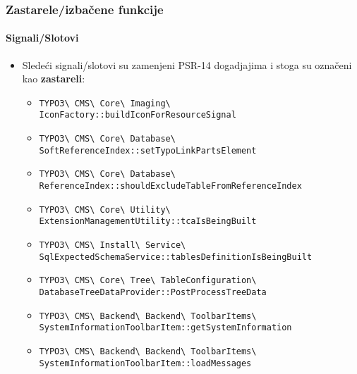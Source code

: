 \begin{frame}[fragile]
	\frametitle{Zastarele/izbačene funkcije}
	\framesubtitle{Signali/Slotovi}

	\lstset{basicstyle=\tiny\ttfamily}

	\begin{itemize}
		\item Sledeći signali/slotovi su zamenjeni PSR-14 dogadjajima i stoga su označeni kao \textbf{zastareli}:
			\newline

			\begin{itemize}\tiny
				\item \texttt{TYPO3\textbackslash
					CMS\textbackslash
					Core\textbackslash
					Imaging\textbackslash
					IconFactory::buildIconForResourceSignal}
					\newline
				\item \texttt{TYPO3\textbackslash
					CMS\textbackslash
					Core\textbackslash
					Database\textbackslash
					SoftReferenceIndex::setTypoLinkPartsElement}
					\newline
				\item \texttt{TYPO3\textbackslash
					CMS\textbackslash
					Core\textbackslash
					Database\textbackslash
					ReferenceIndex::shouldExcludeTableFromReferenceIndex}
					\newline
				\item \texttt{TYPO3\textbackslash
					CMS\textbackslash
					Core\textbackslash
					Utility\textbackslash
					ExtensionManagementUtility::tcaIsBeingBuilt}
					\newline
				\item \texttt{TYPO3\textbackslash
					CMS\textbackslash
					Install\textbackslash
					Service\textbackslash
					SqlExpectedSchemaService::tablesDefinitionIsBeingBuilt}
					\newline
				\item \texttt{TYPO3\textbackslash
					CMS\textbackslash
					Core\textbackslash
					Tree\textbackslash
					TableConfiguration\textbackslash
					DatabaseTreeDataProvider::PostProcessTreeData}
					\newline
				\item \texttt{TYPO3\textbackslash
					CMS\textbackslash
					Backend\textbackslash
					Backend\textbackslash
					ToolbarItems\textbackslash
					SystemInformationToolbarItem::getSystemInformation}
					\newline
				\item \texttt{TYPO3\textbackslash
					CMS\textbackslash
					Backend\textbackslash
					Backend\textbackslash
					ToolbarItems\textbackslash
					SystemInformationToolbarItem::loadMessages}

			\end{itemize}

	\end{itemize}

\end{frame}

